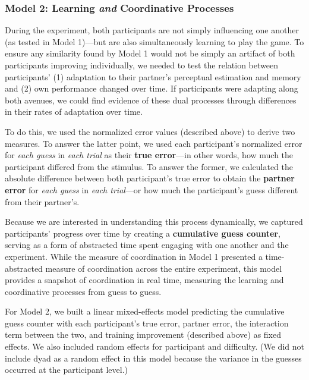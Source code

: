 \documentclass[10pt, letterpaper]{article}
\begin{document}
\subsubsection{\texorpdfstring{Model 2: Learning \emph{and} Coordinative
Processes}{Model 2: Learning and Coordinative Processes}}\label{model-2-learning-and-coordinative-processes}

During the experiment, both participants are not simply influencing one
another (as tested in Model 1)---but are also simultaneously learning to
play the game. To ensure any similarity found by Model 1 would not be
simply an artifact of both participants improving individually, we
needed to test the relation between participants' (1) adaptation to
their partner's perceptual estimation and memory and (2) own performance
changed over time. If participants were adapting along both avenues, we
could find evidence of these dual processes through differences in their
rates of adaptation over time.

To do this, we used the normalized error values (described above) to
derive two measures. To answer the latter point, we used each
participant's normalized error for \emph{each guess} in \emph{each
trial} as their \textbf{true error}---in other words, how much the
participant differed from the stimulus. To answer the former, we
calculated the absolute difference between both participant's true error
to obtain the \textbf{partner error} for \emph{each guess} in \emph{each
trial}---or how much the participant's guess different from their
partner's.

Because we are interested in understanding this process dynamically, we
captured participants' progress over time by creating a
\textbf{cumulative guess counter}, serving as a form of abstracted time
spent engaging with one another and the experiment. While the measure of
coordination in Model 1 presented a time-abstracted measure of
coordination across the entire experiment, this model provides a
snapshot of coordination in real time, measuring the learning and
coordinative processes from guess to guess.

For Model 2, we built a linear mixed-effects model predicting the
cumulative guess counter with each participant's true error, partner
error, the interaction term between the two, and training improvement
(described above) as fixed effects. We also included random effects for
participant and difficulty. (We did not include dyad as a random effect
in this model because the variance in the guesses occurred at the
participant level.)
\end{document}
